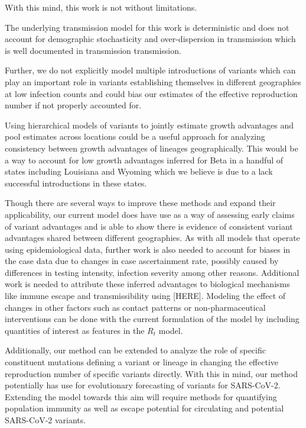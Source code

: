 \documentclass[11pt,oneside,letterpaper]{article}
\begin{document}
With this mind, this work is not without limitations.


The underlying transmission model for this work is deterministic and does not account for demographic stochasticity and over-dispersion in transmission which is well documented in transmission transmission.

Further, we do not explicitly model multiple introductions of variants which can play an important role in variants establishing themselves in different geographies at low infection counts and could bias our estimates of the effective reproduction number if not properly accounted for.

Using hierarchical models of variants to jointly estimate growth advantages and pool estimates across locations could be a useful approach for analyzing consistency between growth advantages of lineages geographically.
This would be a way to account for low growth advantages inferred for Beta in a handful of states including Louisiana and Wyoming which we believe is due to a lack successful introductions in these states.

Though there are several ways to improve these methods and expand their applicability, our current model does have use as a way of assessing early claims of variant advantages and is able to show there is evidence of consistent variant advantages shared between different geographies.
As with all models that operate using epidemiological data, further work is also needed to account for biases in the case data due to changes in case ascertainment rate, possibly caused by differences in testing intensity, infection severity among other reasons.
Additional work is needed to attribute these inferred advantages to biological mechanisms like immune escape and transmissibility using [HERE].
Modeling the effect of changes in other factors such as contact patterns or non-pharmaceutical interventions can be done with the current formulation of the model by including quantities of interest as features in the $R_{t}$ model.

Additionally, our method can be extended to analyze the role of specific constituent mutations defining a variant or lineage in changing the effective reproduction number of specific variants directly.
With this in mind, our method potentially has use for evolutionary forecasting of variants for SARS-CoV-2.
Extending the model towards this aim will require methods for quantifying population immunity as well as escape potential for circulating and potential SARS-CoV-2 variants.
\end{document}
